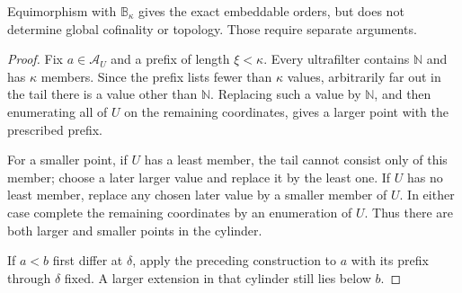 \documentclass[11pt,a4paper]{article}
\newtheorem{lemma}[theorem]{Lemma}
\theoremstyle{definition}
\theoremstyle{remark}
\newcommand{\N}{\mathbb N}
\newcommand{\A}{\mathcal A}
\newcommand{\B}{\mathbb B}
\begin{document}
Equimorphism with $\B_\kappa$ gives the exact embeddable orders, but does not
determine global cofinality or topology. Those require separate arguments.

\begin{proof}
Fix $a\in\A_U$ and a prefix of length $\xi<\kappa$. Every ultrafilter
contains $\N$ and has $\kappa$ members. Since the prefix lists fewer than
$\kappa$ values, arbitrarily far out in the tail there is a value other
than $\N$. Replacing such a value by $\N$, and then enumerating all of
$U$ on the remaining coordinates, gives a larger point with the prescribed
prefix.

For a smaller point, if $U$ has a least member, the tail cannot consist
only of this member; choose a later larger value and replace it by the
least one. If $U$ has no least member, replace any chosen later value by
a smaller member of $U$. In either case complete the remaining coordinates
by an enumeration of $U$. Thus there are both larger and smaller points in
the cylinder.

If $a<b$ first differ at $\delta$, apply the preceding construction to
$a$ with its prefix through $\delta$ fixed. A larger extension in that
cylinder still lies below $b$.
\end{proof}
\end{document}
